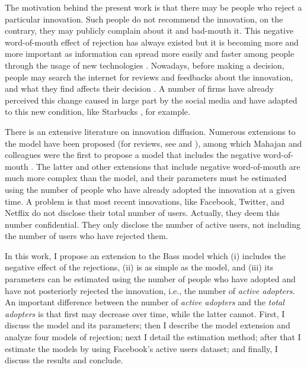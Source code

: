 The motivation behind the present work is that there may be people who reject a particular innovation. Such people do not recommend the innovation, on the contrary, they may publicly complain about it and bad-mouth it. This negative word-of-mouth effect of rejection has always existed \citep{richins1983negative, bone1995word, smith1995effects, buttle1998word} but it is becoming more and more important as information can spread more easily and faster among people through the usage of new technologies \citep{jansen2009twitter, godes2004using, babic2015effect}. Nowadays, before making a decision, people may search the internet for reviews and feedbacks about the innovation, and what they find affects their decision \citep{chen2004impact, dellarocas2003digitization, duan2008online, dellarocas2007exploring, lee2009electronic, pfeffer2014understanding}. A number of firms have already perceived this change caused in large part by the social media and have adapted to this new condition, like Starbucks \citep{gallaugher2010social}, for example.

There is an extensive literature on innovation diffusion. Numerous extensions to the \citet{bass1969} model have been proposed (for reviews, see \citet{meade2006modelling} and \citet{peres2010innovation}), among which Mahajan and colleagues were the first to propose a model that includes the negative word-of-mouth \citep{mahajan1984introduction}. The latter and other extensions that include negative word-of-mouth are much more complex than the \citet{bass1969} model, and their parameters must be estimated using the number of people who have already adopted the innovation at a given time. A problem is that most recent innovations, like Facebook, Twitter, and Netflix do not disclose their total number of users. Actually, they deem this number confidential. They only disclose the number of active users, not including the number of users who have rejected them.

In this work, I propose an extension to the Bass model which (i) includes the negative effect of the rejections, (ii) is as simple as the \citet{bass1969} model, and (iii) its parameters can be estimated using the number of people who have adopted and have not posteriorly rejected the innovation, i.e., the number of \textit{active adopters}. An important difference between the number of \textit{active adopters} and the \textit{total adopters} is that first may decrease over time, while the latter cannot. First, I discuss the \citet{bass1969} model and its parameters; then I describe the model extension and analyze four models of rejection; next I detail the estimation method; after that I estimate the models by using Facebook's active users dataset; and finally, I discuss the results and conclude.

